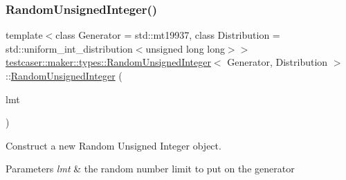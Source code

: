 \subsubsection{\texorpdfstring{RandomUnsignedInteger()}{RandomUnsignedInteger()}\hspace{0.1cm}{\footnotesize\ttfamily [2/3]}}
{\footnotesize\ttfamily template$<$class Generator = std\+::mt19937, class Distribution = std\+::uniform\+\_\+int\+\_\+distribution$<$unsigned long long$>$$>$ \\
\mbox{\hyperlink{classtestcaser_1_1maker_1_1types_1_1RandomUnsignedInteger}{testcaser\+::maker\+::types\+::\+Random\+Unsigned\+Integer}}$<$ Generator, Distribution $>$\+::\mbox{\hyperlink{classtestcaser_1_1maker_1_1types_1_1RandomUnsignedInteger}{Random\+Unsigned\+Integer}} (\begin{DoxyParamCaption}\item[{\mbox{\hyperlink{classtestcaser_1_1maker_1_1RandomUnsignedIntegerLimit}{testcaser\+::maker\+::\+Random\+Unsigned\+Integer\+Limit}}}]{lmt }\end{DoxyParamCaption})\hspace{0.3cm}{\ttfamily [inline]}}



Construct a new Random Unsigned Integer object. 


\begin{DoxyParams}{Parameters}
{\em lmt} & the random number limit to put on the generator \\
\hline
\end{DoxyParams}
\mbox{\label{classtestcaser_1_1maker_1_1types_1_1RandomUnsignedInteger_a485a3c55c963dbfd1fca8b62214f78ad}} 
